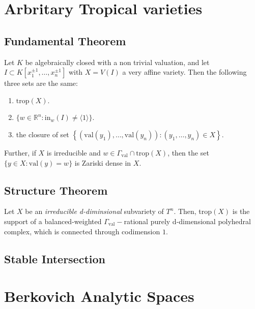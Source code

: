 \section{Arbritary Tropical varieties}
\subsection{Fundamental Theorem}

    \begin{theorem}
        Let $K$ be algebraically closed with a non trivial valuation, and let $I \subset K[x_1^{\pm 1}, \dots, x_n^{\pm 1}]$ with $X = V(I)$ a very affine variety. 
        Then the following three sets are the same:
        \begin{enumerate}
            \item $\text{trop}(X)$.
            \item $\{w \in \mathbb{R}^{n}: \text{in}_{w}(I) \neq \langle 1\rangle\}$. 
            \item the closure of set $\left\{(\text{val}(y_1), \dots, \text{val}(y_n)): (y_1,\dots, y_n) \in X\right\}$.
        \end{enumerate}
        Further, if $X$ is irreducible and $w \in \Gamma_{\text{val}} \cap \text{trop}(X)$, then the set $\{y \in X: \text{val}(y) = w\}$ is Zariski dense in $X$.
    \end{theorem}
\subsection{Structure Theorem}
    \begin{theorem}
        Let $X$ be an \textit{irreducible d-diminsional} subvariety of $T^{n}$. Then, trop$(X)$ is the support of a balanced-weighted $\Gamma_{\text{val}}-$rational purely d-dimensional polyhedral complex, which is connected through codimension $1$.
    \end{theorem}
\subsection{Stable Intersection}

\section{Berkovich Analytic Spaces}

